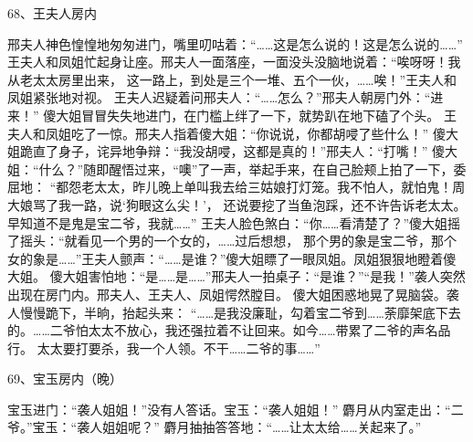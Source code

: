 68、王夫人房内\par
邢夫人神色惶惶地匆匆进门，嘴里叨咕着：“……这是怎么说的！这是怎么说的……”
王夫人和凤姐忙起身让座。邢夫人一面落座，一面没头没脑地说着：“唉呀呀！我从老太太房里出来，
这一路上，到处是三个一堆、五个一伙，……唉！”王夫人和凤姐紧张地对视。
王夫人迟疑着问邢夫人：“……怎么？”邢夫人朝房门外：“进来！”
傻大姐冒冒失失地进门，在门槛上绊了一下，就势趴在地下磕了个头。
王夫人和凤姐吃了一惊。邢夫人指着傻大姐：“你说说，你都胡唚了些什么！”
傻大姐跪直了身子，诧异地争辩：“我没胡唚，这都是真的！”邢夫人：“打嘴！”
傻大姐：“什么？”随即醒悟过来，“噢”了一声，举起手来，在自己脸颊上拍了一下，委屈地：
“都怨老太太，昨儿晚上单叫我去给三姑娘打灯笼。我不怕人，就怕鬼！周大娘骂了我一路，说‘狗眼这么尖！’，
还说要挖了当鱼泡踩，还不许告诉老太太。早知道不是鬼是宝二爷，我就……”
王夫人脸色煞白：“你……看清楚了？”傻大姐摇了摇头：“就看见一个男的一个女的，……过后想想，
那个男的象是宝二爷，那个女的象是……”王夫人颤声：“……是谁？”傻大姐瞟了一眼凤姐。凤姐狠狠地瞪着傻大姐。
傻大姐害怕地：“是……是……”邢夫人一拍桌子：“是谁？”“是我！”袭人突然出现在房门内。邢夫人、王夫人、凤姐愕然膛目。
傻大姐困惑地晃了晃脑袋。袭人慢慢跪下，半晌，抬起头来：
“……是我没廉耻，勾着宝二爷到……荼靡架底下去的。……二爷怕太太不放心，我还强拉着不让回来。如今……带累了二爷的声名品行。
太太要打要杀，我一个人领。不干……二爷的事……”

69、宝玉房内（晚）\par
宝玉进门：“袭人姐姐！”没有人答话。宝玉：“袭人姐姐！”
麝月从内室走出：“二爷。”宝玉：“袭人姐姐呢？”
麝月抽抽答答地：“……让太太给……关起来了。”

